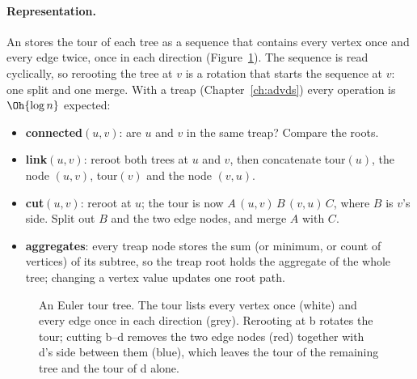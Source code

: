 \paragraph{Representation.} An  stores the tour of each tree as a sequence that contains every vertex once
and every edge twice, once in each direction (Figure~\ref{fig:ett}). The sequence is read cyclically, so rerooting the tree at $v$
is a rotation that starts the sequence at $v$: one split and one merge. With a treap (Chapter~\ref{ch:advds}) every operation is
$\Oh{\log n}$ expected:
\begin{itemize}[itemsep=1pt]
  \item \textbf{connected$(u, v)$}: are $u$ and $v$ in the same treap? Compare the roots.
  \item \textbf{link$(u, v)$}: reroot both trees at $u$ and $v$, then concatenate tour$(u)$, the node $(u, v)$, tour$(v)$ and the
        node $(v, u)$.
  \item \textbf{cut$(u, v)$}: reroot at $u$; the tour is now $A\,(u, v)\,B\,(v, u)\,C$, where $B$ is $v$'s side. Split out $B$
        and the two edge nodes, and merge $A$ with $C$.
  \item \textbf{aggregates}: every treap node stores the sum (or minimum, or count of vertices) of its subtree, so the treap root
        holds the aggregate of the whole tree; changing a vertex value updates one root path.
\end{itemize}

\begin{figure}[htbp]
\centering
{}
\caption{An Euler tour tree. The tour lists every vertex once (white) and every edge once in each direction (grey). Rerooting at b
rotates the tour; cutting b--d removes the two edge nodes (red) together with d's side between them (blue), which leaves the tour
of the remaining tree and the tour of d alone.}
\label{fig:ett}
\end{figure}

